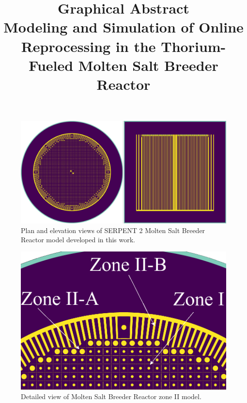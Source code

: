\documentclass[review]{elsarticle}
\begin{document}
\begin{frontmatter}
\title{Graphical Abstract\\
Modeling and Simulation of Online Reprocessing in the Thorium-Fueled Molten Salt Breeder Reactor}
\date{}                     %

\end{frontmatter}

\begin{figure}[htbp!]
    \begin{center}
        \includegraphics[width=\textwidth]{view_serpent.png}
    \end{center}
    \caption{Plan and elevation views of SERPENT 2 Molten Salt Breeder Reactor model developed in this work.}
    \label{fig:graph-abs}
\end{figure}
\begin{figure}[htbp!]
    \begin{center}
        \includegraphics[width=\textwidth]{ser_zone_II.png}
    \end{center}
    \caption{Detailed view of Molten Salt Breeder Reactor zone II model.}
    \label{fig:serpent-zoneII}
\end{figure}
\end{document}
